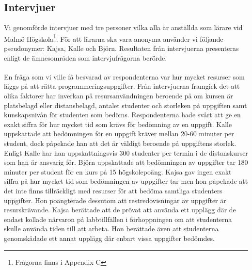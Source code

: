 \documentclass[a4paper,11pt]{article}
\begin{document}
{\subsection{Intervjuer}\label{result:Intervjuer}
Vi genomförde intervjuer med tre personer vilka alla är anställda som lärare vid Malmö Högskola\footnote{Frågorna finns i Appendix C}. För att lärarna ska vara anonyma använder vi följande pseudonymer: Kajsa, Kalle och Björn. Resultaten från intervjuerna presenteras enligt de ämnesområden som intervjufrågorna berörde.
\\
\\
En fråga som vi ville få besvarad av respondenterna var hur mycket resurser som läggs på att rätta programmeringsuppgifter. Från intervjuerna framgick det att olika faktorer har inverkan på resursanvändningen beroende på om kursen är platsbelagd eller distansbelagd, antalet studenter och storleken på uppgiften samt kunskapsnivån för studenten som bedöms. Respondenterna hade svårt att ge en exakt siffra för hur mycket tid som krävs för bedömning av en uppgift.
Kalle uppskattade att bedömningen för en uppgift kräver mellan 20-60 minuter per student, dock påpekade han att det är väldigt beroende på uppgiftens storlek. Enligt Kalle har han uppskattningsvis 300 studenter per termin i de distanskurser som han är ansvarig för.
Björn uppskattade att bedömningen av uppgifter tar 180 minuter per student
för en kurs på 15 högskolepoäng. 
Kajsa gav ingen exakt siffra på hur mycket tid som bedömningen av uppgifter tar men hon påpekade att det inte finns tillräckligt med resurser för att bedöma samtliga studenters uppgifter. Hon poängterade dessutom att restredovisningar av uppgifter är resurskrävande. Kajsa berättade att de prövat att använda ett upplägg där de endast kollade närvaron på labbtillfällen i förhoppningen om att studenterna skulle använda tiden till att arbeta. Hon berättade även att studenterna genomskådade ett annat upplägg där enbart vissa uppgifter bedömdes.

}
\end{document}
